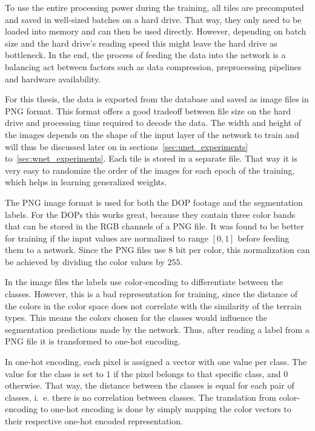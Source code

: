 To use the entire processing power during the training, all tiles are precomputed and saved in well-sized batches on a hard drive. That way, they only need to be loaded into memory and can then be used directly. However, depending on batch size and the hard drive's reading speed this might leave the hard drive as bottleneck. In the end, the process of feeding the data into the network is a balancing act between factors such as data compression, preprocessing pipelines and hardware availability.

For this thesis, the data is exported from the database and saved as image files in PNG format. This format offers a good tradeoff between file size on the hard drive and processing time required to decode the data. The width and height of the images depends on the shape of the input layer of the network to train and will thus be discussed later on in sections~\ref{sec:unet_experiments} to~\ref{sec:wnet_experiments}. Each tile is stored in a separate file. That way it is very easy to randomize the order of the images for each epoch of the training, which helps in learning generalized weights.

The PNG image format is used for both the DOP footage and the segmentation labels. For the DOPs this works great, because they contain three color bands that can be stored in the RGB channels of a PNG file. It was found to be better for training if the input values are normalized to range $[0, 1]$ before feeding them to a network. Since the PNG files use 8 bit per color, this normalization can be achieved by dividing the color values by $255$.

In the image files the labels use color-encoding to differentiate between the classes. However, this is a bad representation for training, since the distance of the colors in the color space does not correlate with the similarity of the terrain types. This means the colors chosen for the classes would influence the segmentation predictions made by the network. Thus, after reading a label from a PNG file it is transformed to one-hot encoding.

In one-hot encoding, each pixel is assigned a vector with one value per class. The value for the class is set to $1$ if the pixel belongs to that specific class, and $0$ otherwise. That way, the distance between the classes is equal for each pair of classes, i.~e. there is no correlation between classes. The translation from color-encoding to one-hot encoding is done by simply mapping the color vectors to their respective one-hot encoded representation.

